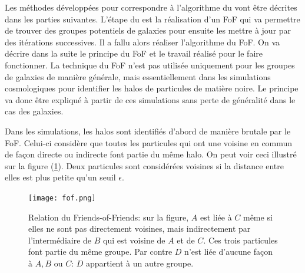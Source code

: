 Les méthodes développées pour correspondre à l'algorithme du \citet{Yang+07} vont être décrites dans les parties suivantes.
L'étape  du \citet{Yang+07} est la réalisation d'un FoF qui va permettre de trouver des groupes potentiels de galaxies pour
ensuite les mettre à jour par des itérations successives. Il a fallu alors réaliser l'algorithme du FoF. On va décrire dans la
suite le principe du FoF et le travail réalisé pour le faire fonctionner.
La technique du FoF n'est pas utilisée uniquement pour les groupes de galaxies de manière générale, mais essentiellement dans les
simulations cosmologiques pour identifier les halos de particules de matière noire. Le principe va donc être expliqué à partir de
ces simulations sans perte de généralité dans le cas des galaxies.

Dans les simulations, les halos sont identifiés d'abord de manière brutale par le FoF. Celui-ci considère que toutes les particules
qui ont une voisine en commun de façon directe ou indirecte font partie du même halo. On peut voir ceci illustré sur la figure
(\ref{fig:fof}). Deux particules sont considérées voisines si la distance entre elles est plus petite qu'un seuil $\epsilon$.
\begin{figure}[htb]
	\centering
	\texttt{[image: fof.png]}
	\caption{\footnotesize{}Relation du Friends-of-Friends: sur la figure, $A$ est liée à $C$ même si elles
	ne sont pas directement voisines, mais indirectement par l'intermédiaire de $B$ qui est
	voisine de $A$ et de $C$. Ces trois particules font partie du même groupe. Par contre $D$
	n'est liée d'aucune façon à $A,B$ ou $C$: $D$ appartient à un autre groupe.}
	\label{fig:fof}
\end{figure}

